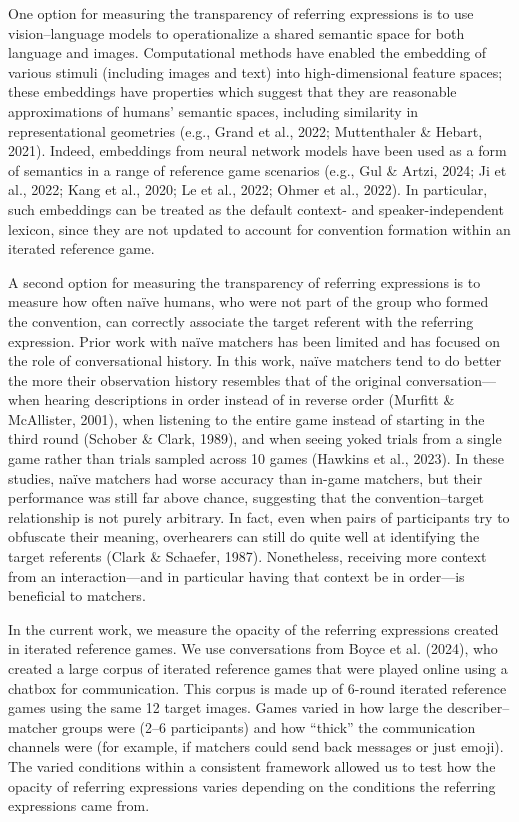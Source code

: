 \documentclass[10pt, letterpaper]{article}
\begin{document}
One option for measuring the transparency of referring expressions is to
use vision--language models to operationalize a shared semantic space
for both language and images. Computational methods have enabled the
embedding of various stimuli (including images and text) into
high-dimensional feature spaces; these embeddings have properties which
suggest that they are reasonable approximations of humans' semantic
spaces, including similarity in representational geometries (e.g., Grand
et al., 2022; Muttenthaler \& Hebart, 2021). Indeed, embeddings from
neural network models have been used as a form of semantics in a range
of reference game scenarios (e.g., Gul \& Artzi, 2024; Ji et al., 2022;
Kang et al., 2020; Le et al., 2022; Ohmer et al., 2022). In particular,
such embeddings can be treated as the default context- and
speaker-independent lexicon, since they are not updated to account for
convention formation within an iterated reference game.

A second option for measuring the transparency of referring expressions
is to measure how often naïve humans, who were not part of the group who
formed the convention, can correctly associate the target referent with
the referring expression. Prior work with naïve matchers has been
limited and has focused on the role of conversational history. In this
work, naïve matchers tend to do better the more their observation
history resembles that of the original conversation---when hearing
descriptions in order instead of in reverse order (Murfitt \&
McAllister, 2001), when listening to the entire game instead of starting
in the third round (Schober \& Clark, 1989), and when seeing yoked
trials from a single game rather than trials sampled across 10 games
(Hawkins et al., 2023). In these studies, naïve matchers had worse
accuracy than in-game matchers, but their performance was still far
above chance, suggesting that the convention--target relationship is not
purely arbitrary. In fact, even when pairs of participants try to
obfuscate their meaning, overhearers can still do quite well at
identifying the target referents (Clark \& Schaefer, 1987). Nonetheless,
receiving more context from an interaction---and in particular having
that context be in order---is beneficial to matchers.

In the current work, we measure the opacity of the referring expressions
created in iterated reference games. We use conversations from Boyce et
al. (2024), who created a large corpus of iterated reference games that
were played online using a chatbox for communication. This corpus is
made up of 6-round iterated reference games using the same 12 target
images. Games varied in how large the describer--matcher groups were
(2--6 participants) and how ``thick'' the communication channels were
(for example, if matchers could send back messages or just emoji). The
varied conditions within a consistent framework allowed us to test how
the opacity of referring expressions varies depending on the conditions
the referring expressions came from.
\end{document}
